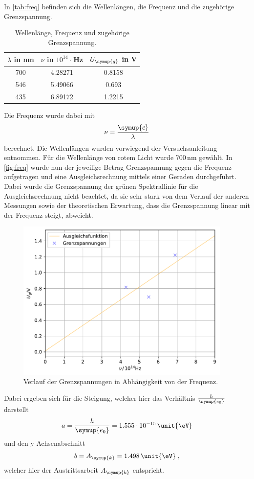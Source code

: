 In \autoref{tab:freq} befinden sich die Wellenlängen, die Frequenz und die zugehörige Grenzspannung. 
\begin{table}
    \centering 
    \caption{Wellenlänge, Frequenz und zugehörige Grenzspannung.}
\begin{tabular}{c c c}
    \toprule
    $\lambda$ in nm &$\nu$ in $10^14\cdot$\,Hz & $U_{\symup{g}}$ in V  \\
    \midrule
    700 & 4.28271 & 0.8158\\ 
546 & 5.49066 & 0.693\\
435 & 6.89172 & 1.2215\\
    \bottomrule
\end{tabular}
\label{tab:freq}
\end{table}

Die Frequenz wurde dabei mit
\begin{equation*}
    \nu = \frac{\symup{c}}{\lambda}
\end{equation*}
berechnet. Die Wellenlängen wurden vorwiegend der Versuchsanleitung \cite{ap500} entnommen. Für die Wellenlänge von rotem Licht wurde 
$700\,\unit{\nm}$ \cite{rot} gewählt.
In \autoref{fig:freq} wurde nun der jeweilige Betrag Grenzspannung gegen die Frequenz aufgetragen und eine Ausgleichsrechnung mittels einer Geraden
durchgeführt. Dabei wurde die Grenzspannung der grünen Spektrallinie für die Ausgleichsrechnung nicht beachtet, da sie sehr stark von dem Verlauf der 
anderen Messungen sowie der theoretischen Erwartung, dass die Grenzspannung linear mit der Frequenz steigt, abweicht.
\begin{figure}
    \centering
    \includegraphics[height = 8cm]{build/frequenz.pdf}
    \caption{Verlauf der Grenzspannungen in Abhängigkeit von der Frequenz.}
    \label{fig:freq}
\end{figure}
Dabei ergeben sich für die Steigung, welcher hier das Verhältnis $\frac{h}{\symup{e_0}}$ darstellt 
\begin{equation*}
    a = \frac{h}{\symup{e_0}} = 1.555 \cdot 10^{-15} \,\unit{\eV}
\end{equation*}
und den y-Achsenabschnitt
\begin{equation*}
    b = A_{\symup{k}} = 1.498 \,\unit{\eV} \; ,
\end{equation*}
welcher hier der Austrittsarbeit $A_{\symup{k}}$ entspricht.

